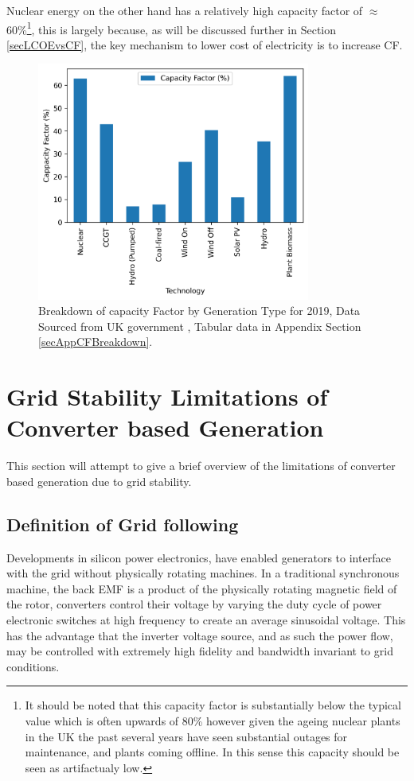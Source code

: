 \documentclass[11pt]{article}
\numberwithin{equation}{section}
\begin{document}
Nuclear energy on the other hand has a relatively high capacity factor of \(\approx\)60\%\footnote{It should be noted that this capacity factor is substantially below the typical value which is often upwards of 80\% however given the ageing nuclear plants in the UK the past several years have seen substantial outages for maintenance, and plants coming offline.  In this sense this capacity should be seen as artifactualy low.}, this is largely because, as will be discussed further in Section \ref{secLCOEvsCF}, the key mechanism to lower cost of electricity is to increase CF.

\begin{figure}[H]
\centering
\includegraphics[width=0.8\textwidth]{./.ob-jupyter/8af7b171434f52c001534a44e0e1e32c5e7c5b94.png}
\caption{\label{figCFBreakdown}Breakdown of capacity Factor by Generation Type for 2019, Data Sourced from UK government \cite{NonRE_CF,RenewableElecricityCap}, Tabular data in Appendix Section \ref{secAppCFBreakdown}.}
\end{figure}
\section{Grid Stability Limitations of Converter based Generation \label{secInertiaLimmitsOfGeneration}}
\label{sec:org67264ae}
This section will attempt to give a brief overview of the limitations of converter based generation due to grid stability.

\subsection{Definition of Grid following}
\label{sec:org79e1658}
Developments in silicon power electronics, have enabled generators to interface with the grid without physically rotating machines. In a traditional synchronous machine, the back EMF is a product of the physically rotating magnetic field of the rotor, converters control their voltage by varying the duty cycle of power electronic switches at high frequency to create an average sinusoidal voltage. This has the advantage that the inverter voltage source, and as such the power flow, may be controlled with extremely high fidelity and bandwidth invariant to grid conditions.
\end{document}
